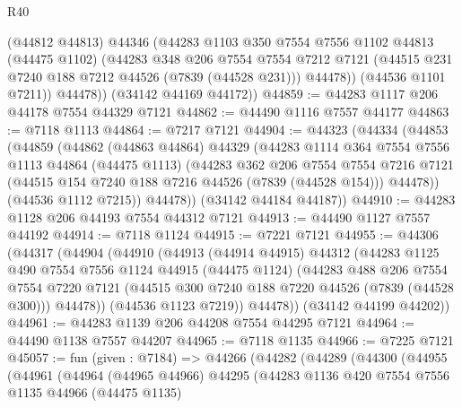 \begin{lexlean}{R40}
\begin{coremodule}
            (@44812 @44813)
            @44346
            (@44283
              @1103
              @350
              @7554
              @7556
              @1102
              @44813
              (@44475 @1102)
              (@44283
                @348
                @206
                @7554
                @7554
                @7212
                @7121
                (@44515 @231 @7240 @188 @7212 @44526 (@7839 (@44528 @231)))
                @44478))
            (@44536 @1101 @7211))
          @44478))
      (@34142 @44169 @44172))
@44859 := @44283 @1117 @206 @44178 @7554 @44329 @7121
@44862 := @44490 @1116 @7557 @44177
@44863 := @7118 @1113
@44864 := @7217 @7121
@44904 := @44323
    (@44334
      (@44853
        (@44859
          (@44862
            (@44863 @44864)
            @44329
            (@44283
              @1114
              @364
              @7554
              @7556
              @1113
              @44864
              (@44475 @1113)
              (@44283
                @362
                @206
                @7554
                @7554
                @7216
                @7121
                (@44515 @154 @7240 @188 @7216 @44526 (@7839 (@44528 @154)))
                @44478))
            (@44536 @1112 @7215))
          @44478))
      (@34142 @44184 @44187))
@44910 := @44283 @1128 @206 @44193 @7554 @44312 @7121
@44913 := @44490 @1127 @7557 @44192
@44914 := @7118 @1124
@44915 := @7221 @7121
@44955 := @44306
    (@44317
      (@44904
        (@44910
          (@44913
            (@44914 @44915)
            @44312
            (@44283
              @1125
              @490
              @7554
              @7556
              @1124
              @44915
              (@44475 @1124)
              (@44283
                @488
                @206
                @7554
                @7554
                @7220
                @7121
                (@44515 @300 @7240 @188 @7220 @44526 (@7839 (@44528 @300)))
                @44478))
            (@44536 @1123 @7219))
          @44478))
      (@34142 @44199 @44202))
@44961 := @44283 @1139 @206 @44208 @7554 @44295 @7121
@44964 := @44490 @1138 @7557 @44207
@44965 := @7118 @1135
@44966 := @7225 @7121
@45057 := fun (given : @7184) =>
  @44266
    (@44282
      (@44289
        (@44300
          (@44955
            (@44961
              (@44964
                (@44965 @44966)
                @44295
                (@44283
                  @1136
                  @420
                  @7554
                  @7556
                  @1135
                  @44966
                  (@44475 @1135)

\end{coremodule}
\end{lexlean}
